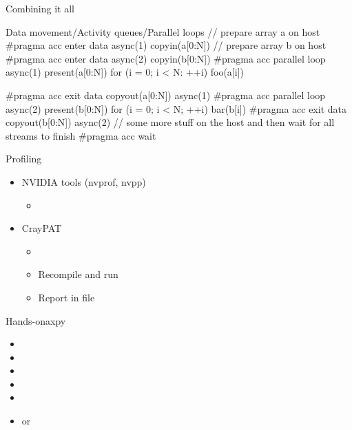 \documentclass[12pt,aspectratio=169]{beamer}
\begin{document}
\begin{frame}[fragile]{Combining it all}
  \begin{Cpplisting}{Data movement/Activity queues/Parallel loops}
// prepare array a on host
#pragma acc enter data async(1) copyin(a[0:N])
// prepare array b on host
#pragma acc enter data async(2) copyin(b[0:N])
#pragma acc parallel loop async(1) present(a[0:N])
for (i = 0; i < N: ++i)
    foo(a[i])

#pragma acc exit data copyout(a[0:N]) async(1)
#pragma acc parallel loop async(2) present(b[0:N])
for (i = 0; i < N; ++i)
    bar(b[i])
#pragma acc exit data copyout(b[0:N]) async(2)
// some more stuff on the host and then wait for all streams to finish
#pragma acc wait

  \end{Cpplisting}
\end{frame}

\begin{frame}[fragile]{Profiling}
  \begin{itemize}
  \item NVIDIA tools (nvprof, nvpp)
    \begin{itemize}
    \item {}
    \end{itemize}
  \item CrayPAT
    \begin{itemize}
    \item {}
    \item Recompile and run
    \item Report in  file
    \end{itemize}
  \end{itemize}
\end{frame}

\begin{frame}[fragile]{Hands-on}{axpy}
  \begin{itemize}
  \item {}
  \item {}
  \item {}
  \item {}
  \item {}
  \item {} or 
  \end{itemize}
\end{frame}
\end{document}
